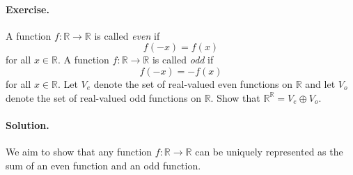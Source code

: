 \documentclass[12pt]{article}
\newenvironment{exercise}{\paragraph{Exercise.}}{}
\newenvironment{solution}{\paragraph{Solution.}}{}
\newcommand{\R}{\mathbb{R}}
\begin{document}
\begin{exercise}
  A function $f : \R \to \R$ is called \textit{even} if \[f(-x) = f(x)\] for
  all $x \in \R$. A function $f : \R \to \R$ is called \textit{odd} if \[f(-x)
  = -f(x)\] for all $x \in \R$. Let $V_e$ denote the set of real-valued even
  functions on $\R$ and let $V_o$ denote the set of real-valued odd functions
  on $\R$. Show that $\R^{\R} = V_e \oplus V_o$.
\end{exercise}

\begin{solution}
  We aim to show that any function $f : \R \to \R$ can be uniquely represented
  as the sum of an even function and an odd function.
\end{solution}
\end{document}
